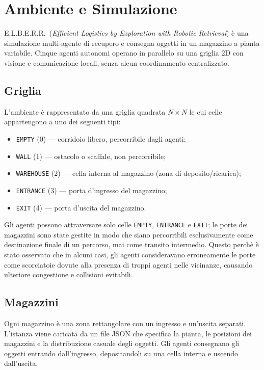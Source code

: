 \chapter{Ambiente e Simulazione}

\textsc{E.L.B.E.R.R.}\ (\textit{Efficient Logistics by Exploration with Robotic Retrieval}) \`e una
simulazione multi-agente di recupero e consegna oggetti in un magazzino a pianta variabile.
Cinque agenti autonomi operano in parallelo su una griglia 2D con visione e comunicazione
locali, senza alcun coordinamento centralizzato.

\section{Griglia}

L'ambiente \`e rappresentato da una griglia quadrata $N \times N$ le cui celle appartengono a
uno dei seguenti tipi:

\begin{itemize}
  \item \texttt{EMPTY} (0) --- corridoio libero, percorribile dagli agenti;
  \item \texttt{WALL} (1) --- ostacolo o scaffale, non percorribile;
  \item \texttt{WAREHOUSE} (2) --- cella interna al magazzino (zona di deposito/ricarica);
  \item \texttt{ENTRANCE} (3) --- porta d'ingresso del magazzino;
  \item \texttt{EXIT} (4) --- porta d'uscita del magazzino.
\end{itemize}

Gli agenti possono attraversare solo celle \texttt{EMPTY}, \texttt{ENTRANCE} e \texttt{EXIT};
le porte dei magazzini sono state gestite in modo che siano percorribili esclusivamente come destinazione finale di un percorso, mai come
transito intermedio. 
Questo perchè è stato osservato che in alcuni casi, gli agenti consideravano erroneamente le porte come scorciatoie dovute alla presenza di troppi agenti nelle vicinanze, causando ulteriore congestione e collisioni evitabili. 
\section{Magazzini}

Ogni magazzino \`e una zona rettangolare con un ingresso e un'uscita separati. L'istanza viene
caricata da un file JSON che specifica la pianta, le posizioni dei magazzini e la
distribuzione casuale degli oggetti. Gli agenti consegnano gli oggetti entrando
dall'ingresso, depositandoli su una cella interna e uscendo dall'uscita.

